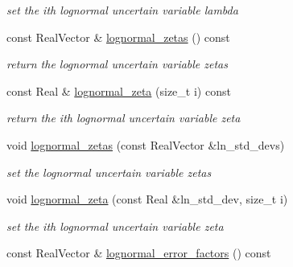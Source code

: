 \begin{DoxyCompactItemize}
\begin{DoxyCompactList}\small\item\em set the ith lognormal uncertain variable lambda \end{DoxyCompactList}\item 
const Real\+Vector \& \hyperlink{classPecos_1_1AleatoryDistParams_a118649f374957ed021c329e0cb1e03d0}{lognormal\+\_\+zetas} () const \label{classPecos_1_1AleatoryDistParams_a118649f374957ed021c329e0cb1e03d0}

\begin{DoxyCompactList}\small\item\em return the lognormal uncertain variable zetas \end{DoxyCompactList}\item 
const Real \& \hyperlink{classPecos_1_1AleatoryDistParams_a6bba36d2029560025215d4d3ce636497}{lognormal\+\_\+zeta} (size\+\_\+t i) const \label{classPecos_1_1AleatoryDistParams_a6bba36d2029560025215d4d3ce636497}

\begin{DoxyCompactList}\small\item\em return the ith lognormal uncertain variable zeta \end{DoxyCompactList}\item 
void \hyperlink{classPecos_1_1AleatoryDistParams_a605a992946ec610dd8a8b0cf55b6b341}{lognormal\+\_\+zetas} (const Real\+Vector \&ln\+\_\+std\+\_\+devs)\label{classPecos_1_1AleatoryDistParams_a605a992946ec610dd8a8b0cf55b6b341}

\begin{DoxyCompactList}\small\item\em set the lognormal uncertain variable zetas \end{DoxyCompactList}\item 
void \hyperlink{classPecos_1_1AleatoryDistParams_a4152ca8f86d8adb160265ab00c3e6c3a}{lognormal\+\_\+zeta} (const Real \&ln\+\_\+std\+\_\+dev, size\+\_\+t i)\label{classPecos_1_1AleatoryDistParams_a4152ca8f86d8adb160265ab00c3e6c3a}

\begin{DoxyCompactList}\small\item\em set the ith lognormal uncertain variable zeta \end{DoxyCompactList}\item 
const Real\+Vector \& \hyperlink{classPecos_1_1AleatoryDistParams_a0bd95fc5a919eaeab5ffcd71ab6f3e11}{lognormal\+\_\+error\+\_\+factors} () const \label{classPecos_1_1AleatoryDistParams_a0bd95fc5a919eaeab5ffcd71ab6f3e11}


\end{DoxyCompactItemize}
